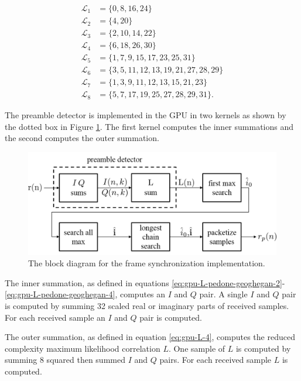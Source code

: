 \begin{equation}
	\begin{split}
	\mathcal{L}_1 &= \{ 0, 8, 16, 24 \}\\
	\mathcal{L}_2 &= \{ 4, 20 \}\\
	\mathcal{L}_3 &= \{ 2, 10, 14, 22 \}\\
	\mathcal{L}_4 &= \{ 6, 18, 26, 30 \}\\
	\mathcal{L}_5 &= \{ 1, 7,  9, 15, 17, 23, 25, 31 \}\\
	\mathcal{L}_6 &= \{ 3, 5, 11, 12, 13, 19, 21, 27, 28, 29 \}\\
	\mathcal{L}_7 &= \{ 1, 3,  9, 11, 12, 13, 15, 21, 23 \}\\
	\mathcal{L}_8 &= \{ 5, 7, 17, 19, 25, 27, 28, 29, 31 \}.
\end{split}
\label{eq:gpu-L-pedone-geoghegan-4}
\end{equation}

The preamble detector is implemented in the GPU in two kernels as shown by the dotted box in Figure \ref{fig:preambleBlock}.
The first kernel computes the inner summations and the second computes the outer summation.
\begin{figure}
	\centering\includegraphics[width=\textwidth/10*8]{figures/gpu/preambleBlock.png}
	\caption{The block diagram for the frame synchronization implementation.}
	\label{fig:preambleBlock}
\end{figure}

The inner summation, as defined in equations \eqref{eq:gpu-L-pedone-geoghegan-2}-\eqref{eq:gpu-L-pedone-geoghegan-4}, computes an $I$ and $Q$ pair.
A single $I$ and $Q$ pair is computed by summing 32 scaled real or imaginary parts of received samples.
For each received sample an $I$ and $Q$ pair is computed.

The outer summation, as defined in equation \eqref{eq:gpu-L-4}, computes the reduced complexity maximum likelihood correlation $L$.
One sample of $L$ is computed by summing 8 squared then summed $I$ and $Q$ pairs.
For each received sample $L$ is computed.

